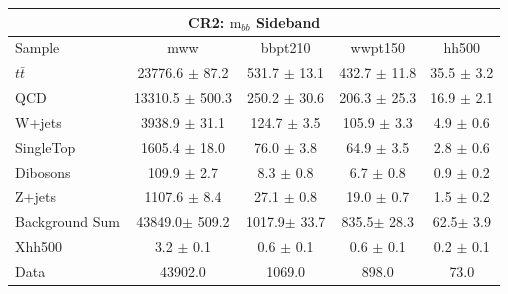 \documentclass{beamer}
\newcommand*{\ttbar}{\ensuremath{t\bar{t}}\xspace}
\newcommand*{\mbb}{\ensuremath{\text{m}_{bb}}\xspace}
\newcommand*{\header}[1]{\fontsize{16}{8}\selectfont \textbf{{\color{MyPurple}{#1}}}}
\begin{document}
\begin{frame}
\begin{center}
\header{CR2 500}
\end{center}
\begin{table}
\tiny
\begin{tabular}{l|c|c|c|c}
\hline\hline
\multicolumn{5}{c}{\textbf{CR2}: \mbb Sideband}\\\hline\hline
Sample  	& mww 	& bbpt210 	& wwpt150 	& hh500  \\\hline
\ttbar 	& 23776.6 $\pm$ 87.2 	& 531.7 $\pm$ 13.1 	& 432.7 $\pm$ 11.8 	& 35.5 $\pm$ 3.2 		\\\hline 
QCD 	& 13310.5 $\pm$ 500.3 	& 250.2 $\pm$ 30.6 	& 206.3 $\pm$ 25.3 	& 16.9 $\pm$ 2.1 		\\\hline 
W+jets 	& 3938.9 $\pm$ 31.1 	& 124.7 $\pm$ 3.5 	& 105.9 $\pm$ 3.3 	& 4.9 $\pm$ 0.6 	\\\hline 
SingleTop 	& 1605.4 $\pm$ 18.0 	& 76.0 $\pm$ 3.8 	& 64.9 $\pm$ 3.5 	& 2.8 $\pm$ 0.6 	\\\hline 
Dibosons 	& 109.9 $\pm$ 2.7 	& 8.3 $\pm$ 0.8 	& 6.7 $\pm$ 0.8 	& 0.9 $\pm$ 0.2 	\\\hline 
Z+jets 	& 1107.6 $\pm$ 8.4 	& 27.1 $\pm$ 0.8 	& 19.0 $\pm$ 0.7 	& 1.5 $\pm$ 0.2 		\\\hline 
\hline
Background Sum 	& 43849.0$\pm$ 509.2 	& 1017.9$\pm$ 33.7 	& 835.5$\pm$ 28.3 	& 62.5$\pm$ 3.9	\\\hline 
\hline
Xhh500 	& 3.2 $\pm$ 0.1 	& 0.6 $\pm$ 0.1 	& 0.6 $\pm$ 0.1 	& 0.2 $\pm$ 0.1 	\\\hline 
Data 	& 43902.0 	& 1069.0 	& 898.0 	& 73.0 	\\\hline 
\end{tabular}
\end{table}
\end{frame}
\end{document}
